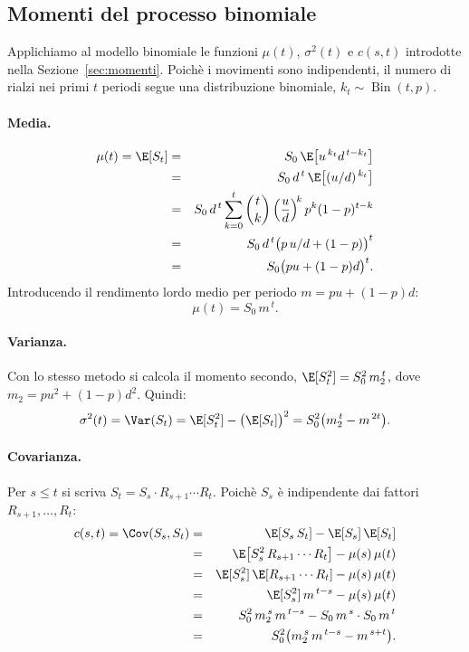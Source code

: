 \subsection{Momenti del processo binomiale}

\noindent
Applichiamo al modello binomiale le funzioni $\mu(t)$, $\sigma^2(t)$
e $c(s,t)$ introdotte nella Sezione~\ref{sec:momenti}. Poich\`{e} i
movimenti sono indipendenti, il numero di rialzi nei primi $t$ periodi
segue una distribuzione binomiale, $k_t\sim\operatorname{Bin}(t,p)$.

\paragraph{Media.}
\begin{eqnarray*}
\mu(t)=\E[S_t]
&=& S_0\,\E\bigl[u^{\,k_t}d^{\,t-k_t}\bigr]\\
&=& S_0\,d^{\,t}\,\E\bigl[(u/d)^{\,k_t}\bigr]\\
&=& S_0\,d^{\,t}\sum_{k=0}^{t}\binom{t}{k}
    \left(\frac{u}{d}\right)^{\!k}p^k(1-p)^{t-k}\\
&=& S_0\,d^{\,t}\bigl(p\,u/d+(1-p)\bigr)^t\\
&=& S_0\bigl(pu+(1-p)d\bigr)^t.
\end{eqnarray*}
Introducendo il rendimento lordo medio per periodo $m=pu+(1-p)d$:
\[
\mu(t)=S_0\,m^{\,t}.
\]

\paragraph{Varianza.}
Con lo stesso metodo si calcola il momento secondo,
$\E[S_t^2]=S_0^2\,m_2^{\,t}$, dove $m_2=pu^2+(1-p)d^2$. Quindi:
\[
\sigma^2(t)=\Var(S_t)=\E[S_t^2]-\bigl(\E[S_t]\bigr)^2
=S_0^2\bigl(m_2^{\,t}-m^{\,2t}\bigr).
\]

\paragraph{Covarianza.}
Per $s\leq t$ si scriva $S_t=S_s\cdot R_{s+1}\cdots R_t$. Poich\`{e}
$S_s$ \`{e} indipendente dai fattori $R_{s+1},\ldots,R_t$:
\begin{eqnarray*}
c(s,t)=\Cov(S_s,S_t)
&=& \E[S_s\,S_t]-\E[S_s]\,\E[S_t]\\
&=& \E\bigl[S_s^2\,R_{s+1}\cdots R_t\bigr]-\mu(s)\,\mu(t)\\
&=& \E[S_s^2]\,\E[R_{s+1}\cdots R_t]-\mu(s)\,\mu(t)\\
&=& \E[S_s^2]\,m^{\,t-s}-\mu(s)\,\mu(t)\\
&=& S_0^2\,m_2^{\,s}\,m^{\,t-s}-S_0\,m^{\,s}\cdot S_0\,m^{\,t}\\
&=& S_0^2\bigl(m_2^{\,s}\,m^{\,t-s}-m^{\,s+t}\bigr).
\end{eqnarray*}

